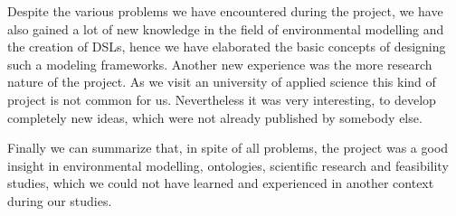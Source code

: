 \par
Despite the various problems we have encountered during the project, we have also gained a lot of new knowledge in the field of environmental modelling and the creation of DSLs, hence we have elaborated the basic concepts of designing such a modeling frameworks. Another new experience was the more research nature of the project. As we visit an university of applied science this kind of project is not common for us. Nevertheless it was very interesting, to develop completely new ideas, which were not already published by somebody else.
\par
Finally we can summarize that, in spite of all problems, the project was a good insight in environmental modelling, ontologies, scientific research and feasibility studies, which we could not have learned and experienced in another context during our studies.   
















